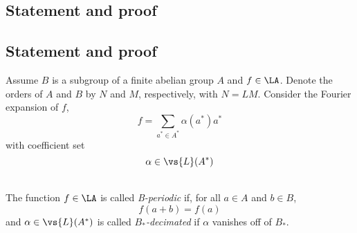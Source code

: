 {\subsection{Statement and proof}}
{\subsection{Statement and proof\protect\footnotemark}
}
Assume $B$ is a subgroup of a finite abelian group $A$ and $f\in \LA$.
Denote the orders of $A$ and $B$ by $N$ and $M$, respectively, with $N = LM$.
Consider the Fourier expansion of $f$,
\[
f = \sum_{a^*\in A^*} \alpha(a^*)a^*
\]
with coefficient set
\[
\alpha \in \vs{L}(A^*)
\]
\begin{definition}[Periodic]\\
The function $f\in \LA$ is called \emph{B-periodic} if, for all $a\in A$ and
$b\in B$, 
\[
f(a+b) = f(a)
\]
and $\alpha \in \vs{L}(A^*)$ is called $B_*$\emph{-decimated} if $\alpha$ vanishes
off of $B_*$.
\end{definition}

